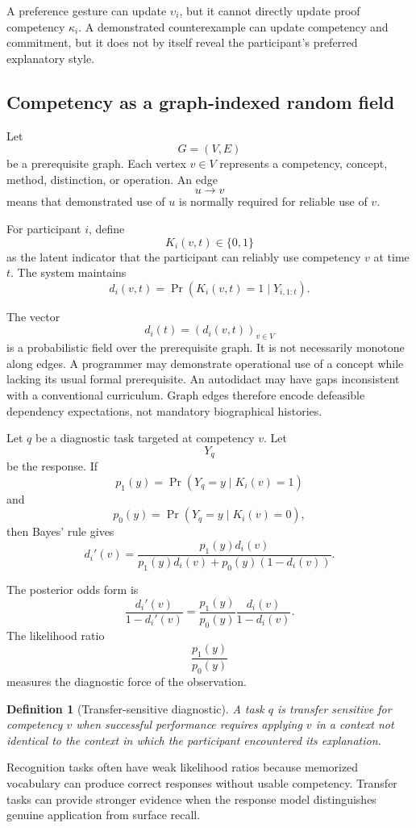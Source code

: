 \documentclass[11pt]{article}
\newtheorem{definition}{Definition}[section]
\theoremstyle{definition}
\DeclareMathOperator{\Prob}{Pr}
\begin{document}
A preference gesture can update \(\upsilon_i\), but it cannot directly update proof competency \(\kappa_i\). A demonstrated counterexample can update competency and commitment, but it does not by itself reveal the participant's preferred explanatory style.

\subsection{Competency as a graph-indexed random field}

Let
\[
G=(V,E)
\]
be a prerequisite graph. Each vertex \(v\in V\) represents a competency, concept, method, distinction, or operation. An edge
\[
u\to v
\]
means that demonstrated use of \(u\) is normally required for reliable use of \(v\).

For participant \(i\), define
\[
K_i(v,t)\in\{0,1\}
\]
as the latent indicator that the participant can reliably use competency \(v\) at time \(t\). The system maintains
\[
d_i(v,t)
=
\Prob(K_i(v,t)=1\mid Y_{i,1:t}).
\]

The vector
\[
d_i(t)
=
(d_i(v,t))_{v\in V}
\]
is a probabilistic field over the prerequisite graph. It is not necessarily monotone along edges. A programmer may demonstrate operational use of a concept while lacking its usual formal prerequisite. An autodidact may have gaps inconsistent with a conventional curriculum. Graph edges therefore encode defeasible dependency expectations, not mandatory biographical histories.

Let \(q\) be a diagnostic task targeted at competency \(v\). Let
\[
Y_q
\]
be the response. If
\[
p_1(y)
=
\Prob(Y_q=y\mid K_i(v)=1)
\]
and
\[
p_0(y)
=
\Prob(Y_q=y\mid K_i(v)=0),
\]
then Bayes' rule gives
\[
d_i'(v)
=
\frac{
p_1(y)d_i(v)
}{
p_1(y)d_i(v)+p_0(y)(1-d_i(v))
}.
\]

The posterior odds form is
\[
\frac{d_i'(v)}{1-d_i'(v)}
=
\frac{p_1(y)}{p_0(y)}
\frac{d_i(v)}{1-d_i(v)}.
\]
The likelihood ratio
\[
\frac{p_1(y)}{p_0(y)}
\]
measures the diagnostic force of the observation.

\begin{definition}[Transfer-sensitive diagnostic]
A task \(q\) is transfer sensitive for competency \(v\) when successful performance requires applying \(v\) in a context not identical to the context in which the participant encountered its explanation.
\end{definition}

Recognition tasks often have weak likelihood ratios because memorized vocabulary can produce correct responses without usable competency. Transfer tasks can provide stronger evidence when the response model distinguishes genuine application from surface recall.
\end{document}
